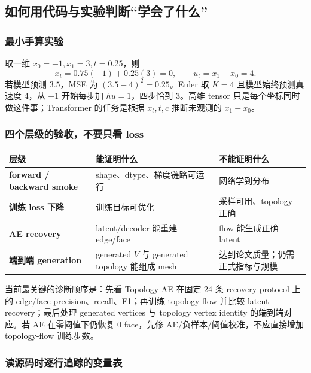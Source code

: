 \documentclass[11pt,a4paper]{ctexart}
\begin{document}
\subsection{如何用代码与实验判断“学会了什么”}

\subsubsection*{最小手算实验}

取一维 $x_0=-1,x_1=3,t=0.25$，则
\begin{equation}
x_t=0.75(-1)+0.25(3)=0,\qquad u_t=x_1-x_0=4.
\end{equation}
若模型预测 $3.5$，MSE 为 $(3.5-4)^2=0.25$。Euler 取 $K=4$ 且模型始终预测真速度 4，从 $-1$ 开始每步加 $h u=1$，四步恰到 3。高维 tensor 只是每个坐标同时做这件事；Transformer 的任务是根据 $x_t,t,c$ 推断未观测的 $x_1-x_0$。

\subsubsection*{四个层级的验收，不要只看 loss}

\begin{longtable}{>{\bfseries}p{2.7cm}p{5.7cm}p{6.0cm}}
\toprule
层级 & 能证明什么 & 不能证明什么\\
\midrule
forward / backward smoke & shape、dtype、梯度链路可运行 & 网络学到分布\\
训练 loss 下降 & 训练目标可优化 & 采样可用、topology 正确\\
AE recovery & latent/decoder 能重建 edge/face & flow 能生成正确 latent\\
端到端 generation & generated $V$ 与 generated topology 能组成 mesh & 达到论文质量；仍需正式指标与规模\\
\bottomrule
\end{longtable}

当前最关键的诊断顺序是：先看 Topology AE 在固定 24 条 recovery protocol 上的 edge/face precision、recall、F1；再训练 topology flow 并比较 latent recovery；最后处理 generated vertices 与 topology vertex identity 的端到端对应。若 AE 在零阈值下仍恢复 0 face，先修 AE/负样本/阈值校准，不应直接增加 topology-flow 训练步数。

\subsubsection*{读源码时逐行追踪的变量表}
\end{document}
